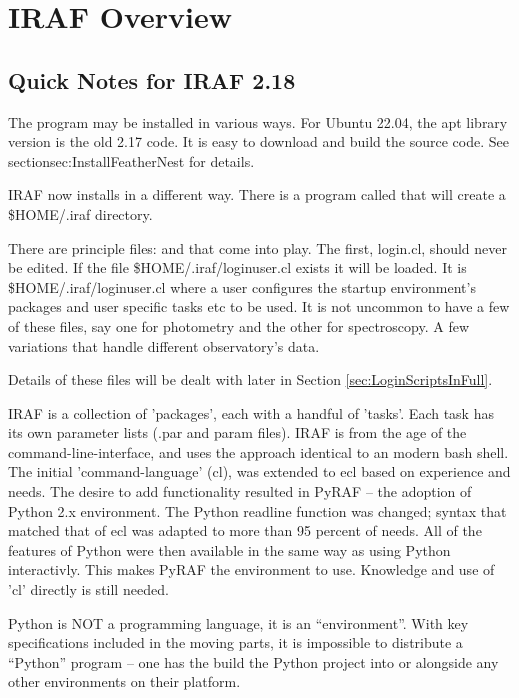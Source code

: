\section{IRAF Overview} \label{sec:IRAFOverview}

\subsection*{Quick Notes for IRAF 2.18}

The program may be installed in various ways. For Ubuntu 22.04, the 
apt library version is the old 2.17 code. It is easy to download and
build the source code. See section{sec:InstallFeatherNest} for details.

IRAF now installs in a different way. There is a program called 
that will create a \$HOME/.iraf directory. 

There are principle files:  and 
that come into play. The first, login.cl, should never be edited. If the file
\$HOME/.iraf/loginuser.cl exists it will be loaded. It is \$HOME/.iraf/loginuser.cl
where a user configures the startup environment's packages and user specific
tasks etc to be used. It is not uncommon to have a few of these files, say
one for photometry and the other for spectroscopy. A few variations that
handle different observatory's data. 

Details of these files will be dealt with later in Section \ref{sec:LoginScriptsInFull}.

IRAF  is a collection of
'packages', each with a handful of 'tasks'. Each task has its own
parameter lists (.par and param files). IRAF is from the age of the
command-line-interface, and uses the approach identical to an modern
bash shell. The initial 'command-language' (cl), was extended to ecl
based on experience and needs. The desire to add functionality
resulted in PyRAF -- the adoption of Python 2.x environment. The
Python readline function was changed; syntax that matched that of ecl
was adapted to more than 95 percent of needs. All of the features of
Python were then available in the same way as using Python
interactivly.  This makes PyRAF the environment to use. Knowledge and
use of 'cl' directly is still needed.

Python is NOT a programming language, it is an ``environment''. With key
specifications included in the moving parts, it is impossible to distribute
a ``Python'' program -- one has the build the Python project into or
alongside any other environments on their platform. 

